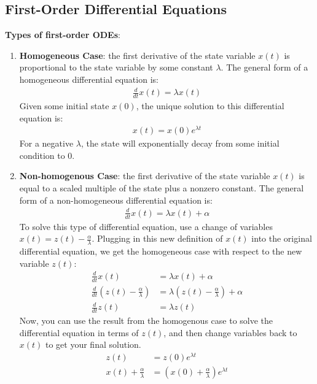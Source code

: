 \subsection*{First-Order Differential Equations}
\textbf{Types of first-order ODEs}:
\begin{enumerate}
    \item \textbf{Homogeneous Case}: the first derivative of the state variable $x(t)$ is proportional to the state variable by some constant $\lambda$. The general form of a homogeneous differential equation is:
    \begin{align*}
        \boxed{\frac{d}{dt} x(t) = \lambda x(t)}
    \end{align*}
    Given some initial state $x(0)$, the unique solution to this differential equation is:
    \begin{align*}
        \boxed{x(t) = x(0) e^{\lambda t}}
    \end{align*}
    For a negative $\lambda$, the state will exponentially decay from some initial condition to 0.

    \item \textbf{Non-homogenous Case}: the first derivative of the state variable $x(t)$ is equal to a scaled multiple of the state plus a nonzero constant. The general form of a non-homogeneous differential equation is:
    \begin{align*}
        \boxed{\frac{d}{dt} x(t) = \lambda x(t) + \alpha}
    \end{align*}
    To solve this type of differential equation, use a change of variables $x(t) = z(t) - \frac{\alpha}{\lambda}$. Plugging in this new definition of $x(t)$ into the original differential equation, we get the homogeneous case with respect to the new variable $z(t)$:
    \begin{align*}
        \frac{d}{dt} x(t) &= \lambda x(t) + \alpha \\
        \frac{d}{dt} (z(t) - \frac{\alpha}{\lambda}) &= \lambda (z(t) - \frac{\alpha}{\lambda}) + \alpha \\
        \frac{d}{dt} z(t) &= \lambda z(t)
    \end{align*}
    Now, you can use the result from the homogenous case to solve the differential equation in terms of $z(t)$, and then change variables back to $x(t)$ to get your final solution.
    \begin{align*}
        z(t) &= z(0) e^{\lambda t} \\
        x(t) + \frac{\alpha}{\lambda} &= (x(0) + \frac{\alpha}{\lambda}) e^{\lambda t} \\
    \end{align*}


\end{enumerate}
